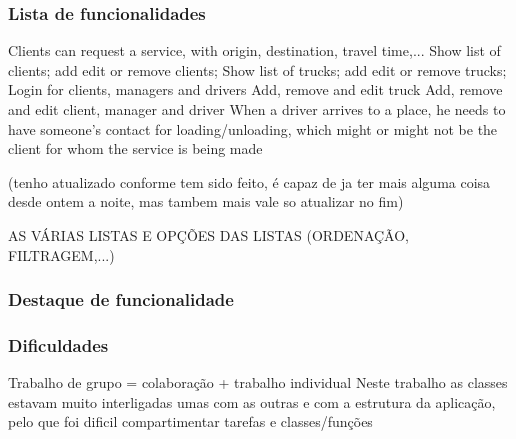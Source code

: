 \documentclass{beamer}
\def\\{}
\begin{document}
\begin{frame}
\frametitle{Lista de funcionalidades} 
Clients can request a service, with origin, destination, travel time,...\\
Show list of clients; add edit or remove clients;\\
 Show list of trucks; add edit or remove trucks;\\
 Login for clients, managers and drivers\\
 Add, remove and edit truck\\
 Add, remove and edit client, manager and driver\\
 When a driver arrives to a place, he needs to have someone's contact for loading/unloading, which might or might not be the client for whom the service is being made\\

(tenho atualizado conforme tem sido feito, é capaz de ja ter mais alguma coisa desde ontem a noite, mas tambem mais vale so atualizar no fim)
\end{frame}

\begin{frame}
AS VÁRIAS LISTAS E OPÇÕES DAS LISTAS (ORDENAÇÃO, FILTRAGEM,...)
\end{frame}

\begin{frame}
\frametitle{Destaque de funcionalidade}
\end{frame}

\begin{frame}
\frametitle{Dificuldades}
Trabalho de grupo = colaboração + trabalho individual\\
Neste trabalho as classes estavam muito interligadas umas com as outras e com a estrutura da aplicação, pelo que foi dificil compartimentar tarefas e classes/funções
\end{frame}
\end{document}
